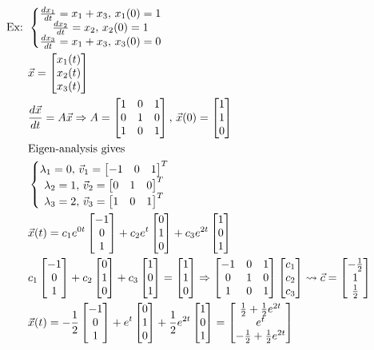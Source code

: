 \documentclass[11pt, fleqn]{article}
\begin{document}
\begin{align*}
    \text{Ex: }&\eqnsystem{\frac{dx_1}{dt}=x_1+x_3,\,x_1(0)=1\\\frac{dx_2}{dt}=x_2,\,x_2(0)=1\\\frac{dx_3}{dt}=x_1+x_3,\,x_3(0)=0}\\
    &\vec{x}=\matrixx{x_1(t)\\x_2(t)\\x_3(t)}\\
    &\frac{d\vec{x}}{dt}=A\vec{x}\Ra A=\matrixx{1&0&1\\0&1&0\\1&0&1},\,\vec{x}(0)=\matrixx{1\\1\\0}\\
    &\text{Eigen-analysis gives}\\
    &\eqnsystem{\lambda_1=0,\,\vec{v}_1=\matrixx{-1&0&1}^T\\\lambda_2=1,\,\vec{v}_2=\matrixx{0&1&0}^T\\\lambda_3=2,\,\vec{v}_3=\matrixx{1&0&1}^T}\\
    &\vec{x}(t)=c_1e^{0t}\matrixx{-1\\0\\1}+c_2e^t\matrixx{0\\1\\0}+c_3e^{2t}\matrixx{1\\0\\1}\\
    &c_1\matrixx{-1\\0\\1}+c_2\matrixx{0\\1\\0}+c_3\matrixx{1\\0\\1}=\matrixx{1\\1\\0}\Ra \matrixx{-1&0&1\\0&1&0\\1&0&1}\matrixx{c_1\\c_2\\c_3}\leadsto\vec{c}=\matrixx{-\frac{1}{2}\\1\\\frac{1}{2}}\\
    &\vec{x}(t)=-\frac{1}{2}\matrixx{-1\\0\\1}+e^t\matrixx{0\\1\\0}+\frac{1}{2}e^{2t}\matrixx{1\\0\\1}=\matrixx{\frac{1}{2}+\frac{1}{2}e^{2t}\\e^t\\-\frac{1}{2}+\frac{1}{2}e^{2t}}
\end{align*}
\end{document}
